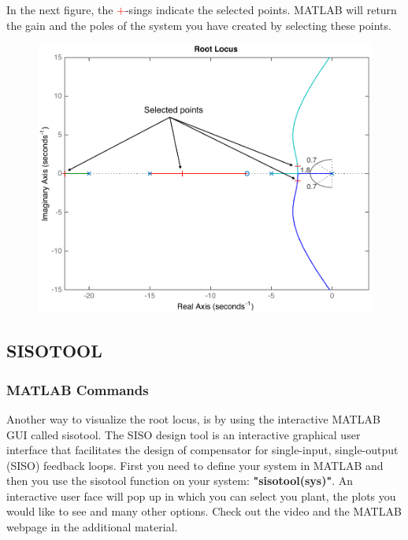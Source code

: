 \begin{frame}
	\begin{exampleblock}{}
		In the next figure, the \textcolor{red}{$+$}-sings indicate the selected points. MATLAB will return the gain and the poles of the system you have created by selecting these points.
		\vspace{-0.5em}
		\begin{figure}
			\centering
			\includegraphics[width=0.6\linewidth]{matlab_ex3}
		\end{figure}
	\end{exampleblock}
\end{frame}

\subsection{SISOTOOL}

\begin{frame}
\frametitle{MATLAB Commands}
	Another way to visualize the root locus, is by using the interactive MATLAB GUI called sisotool. The SISO design tool is an interactive graphical user interface that facilitates the design of compensator for single-input, single-output (SISO) feedback loops.
	\vspace{1em}
	First you need to define your system in MATLAB and then you use the sisotool function on your system: \textbf{"sisotool(sys)"}. An interactive user face will pop up in which you can select you plant, the plots you would like to see and many other options. Check out the video and the MATLAB webpage in the additional material.	
\end{frame}